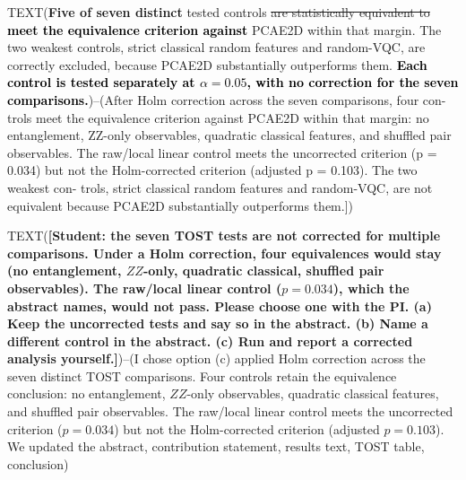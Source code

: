 \documentclass[pdflatex,sn-basic]{sn-jnl}
\newcommand{\snew}[1]{\textbf{\textcolor{studentgreen}{#1}}}
\newcommand{\del}[1]{\sout{#1}}
\newcommand{\add}[1]{\textbf{\textcolor{black}{#1}}}
\begin{document}
TEXT(\snew{Five of seven distinct} tested controls \del{are statistically equivalent to}
\add{meet the equivalence criterion against} PCAE2D within that margin. The two weakest controls, strict classical random
features and random-VQC, are correctly excluded, because PCAE2D substantially
outperforms them. \add{Each control is tested separately at $\alpha=0.05$, with
no correction for the seven comparisons.})--(After Holm correction across the seven comparisons, four con-
trols meet the equivalence criterion against PCAE2D within that margin: no
entanglement, ZZ-only observables, quadratic classical features, and shuffled pair
observables. The raw/local linear control meets the uncorrected criterion (p = 0.034)
but not the Holm-corrected criterion (adjusted p = 0.103). The two weakest con-
trols, strict classical random features and random-VQC, are not equivalent because
PCAE2D substantially outperforms them.])

TEXT({\color{red}\textbf{[Student: the seven TOST tests are not corrected for
multiple comparisons. Under a Holm correction, four equivalences would stay (no
entanglement, $ZZ$-only, quadratic classical, shuffled pair observables). The
raw/local linear control ($p=0.034$), which the abstract names, would not pass.
Please choose one with the PI. (a) Keep the uncorrected tests and say so in the
abstract. (b) Name a different control in the abstract. (c) Run and report a
corrected analysis yourself.]}})--(I chose option (c) applied Holm correction across the seven
distinct TOST comparisons. Four controls retain the equivalence conclusion:
no entanglement, $ZZ$-only observables, quadratic classical features, and
shuffled pair observables. The raw/local linear control meets the uncorrected
criterion ($p=0.034$) but not the Holm-corrected criterion
(adjusted $p=0.103$). We updated the abstract, contribution statement, results
text, TOST table, conclusion)
\end{document}
